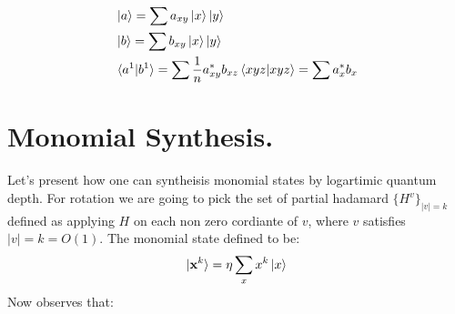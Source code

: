 \documentclass[manuscript,screen,review]{acmart}
\begin{document}
\begin{equation*}
  \begin{split}
    & \ket{a} = \sum a_{xy}\ket{x}\ket{y} \\
    & \ket{b} = \sum b_{xy}\ket{x}\ket{y} \\
    & \braket{a^{1}|b^{1}} = \sum \frac{1}{n}a_{xy}^{*}b_{xz}\braket{xyz|xyz} =
    \sum a_{x}^{*}b_{x}
  \end{split}
\end{equation*}




\section{Monomial Synthesis.}
Let's present how one can syntheisis monomial states by logartimic quantum
depth. For rotation we are going to pick the set of partial hadamard
$\{H^{v}\}_{|v| = k} $ defined as applying $H$ on each non zero cordiante of
$v$, where $v$ satisfies $|v| = k = O(1)$. The monomial state defined to be:
\begin{equation*}
  \begin{split}
    \ket{\mathbf{x}^{k}} = \eta \sum_{x}x^{k}\ket{x}
  \end{split}
\end{equation*}
Now observes that:
\end{document}
